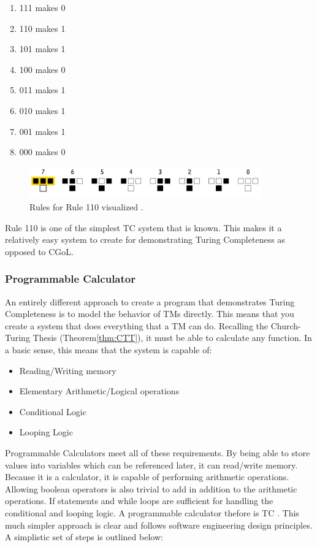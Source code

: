 \begin{enumerate}
    \item 111 makes 0
    \item 110 makes 1
    \item 101 makes 1
    \item 100 makes 0
    \item 011 makes 1
    \item 010 makes 1
    \item 001 makes 1
    \item 000 makes 0
\end{enumerate}

\begin{figure}[htb]
    \centering
    \includegraphics[width=10cm]{images/rule110.png}
       \caption{Rules for Rule 110 visualized \cite{Rule110Img}.}
           \label{fig:Rule110}
\end{figure}

Rule 110 is one of the simplest TC system that is known.
This makes it a relatively easy system to create for demonstrating Turing Completeness as opposed to CGoL.

\subsubsection{Programmable Calculator}\label{subsubsec:ProgCalc}

An entirely different approach to create a program that demonstrates Turing Completeness is to model the behavior of TMs directly.
This means that you create a system that does everything that a TM can do.
Recalling the Church-Turing Thesis (Theorem\ref{thm:CTT}), it must be able to calculate any function.
In a basic sense, this means that the system is capable of:

\begin{itemize}
    \item Reading/Writing memory
    \item Elementary Arithmetic/Logical operations
    \item Conditional Logic
    \item Looping Logic
\end{itemize}

Programmable Calculators meet all of these requirements.
By being able to store values into variables which can be referenced later, it can read/write memory.
Because it is a calculator, it is capable of performing arithmetic operations.
Allowing boolean operators is also trivial to add in addition to the arithmetic operations.
If statements and while loops are sufficient for handling the conditional and looping logic.
A programmable calculator thefore is TC \cite{CalcTC}.
This much simpler approach is clear and follows software engineering design principles.
A simplistic set of steps is outlined below:

